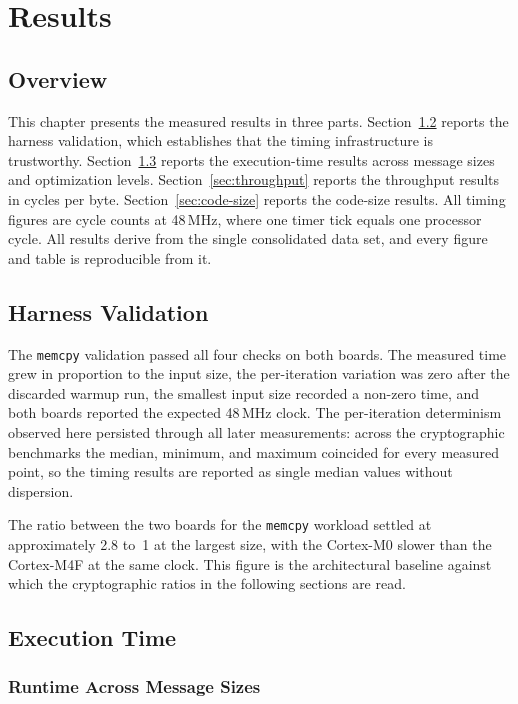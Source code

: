 \chapter{Results}

\section{Overview}

This chapter presents the measured results in three parts.
Section~\ref{sec:harness-val} reports the harness validation, which establishes
that the timing infrastructure is trustworthy.
Section~\ref{sec:exec-time} reports the execution-time results across message
sizes and optimization levels.
Section~\ref{sec:throughput} reports the throughput results in cycles per byte.
Section~\ref{sec:code-size} reports the code-size results.
All timing figures are cycle counts at 48\,MHz, where one timer tick equals one
processor cycle.
All results derive from the single consolidated data set, and every figure and
table is reproducible from it.

\section{Harness Validation}
\label{sec:harness-val}

The \texttt{memcpy} validation passed all four checks on both boards.
The measured time grew in proportion to the input size, the per-iteration
variation was zero after the discarded warmup run, the smallest input size
recorded a non-zero time, and both boards reported the expected 48\,MHz clock.
The per-iteration determinism observed here persisted through all later
measurements: across the cryptographic benchmarks the median, minimum, and
maximum coincided for every measured point, so the timing results are reported
as single median values without dispersion.

The ratio between the two boards for the \texttt{memcpy} workload settled at
approximately 2.8 to~1 at the largest size, with the Cortex-M0 slower than the
Cortex-M4F at the same clock.
This figure is the architectural baseline against which the cryptographic ratios
in the following sections are read.

\section{Execution Time}
\label{sec:exec-time}

\subsection{Runtime Across Message Sizes}

